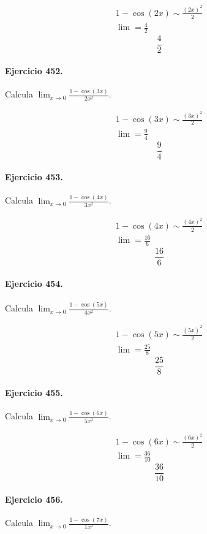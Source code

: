 \documentclass[11pt,a4paper]{article}
\begin{document}
\[
\begin{aligned}
1-\cos(2x)\sim \frac{(2x)^2}{2}\\
\lim=\frac{4}{2}
\end{aligned}
\]
\[\boxed{\frac{4}{2}}\]


\paragraph{Ejercicio 452.} Calcula $\displaystyle\lim_{x\to0}\frac{1-\cos(3x)}{2x^2}$.

\[
\begin{aligned}
1-\cos(3x)\sim \frac{(3x)^2}{2}\\
\lim=\frac{9}{4}
\end{aligned}
\]
\[\boxed{\frac{9}{4}}\]


\paragraph{Ejercicio 453.} Calcula $\displaystyle\lim_{x\to0}\frac{1-\cos(4x)}{3x^2}$.

\[
\begin{aligned}
1-\cos(4x)\sim \frac{(4x)^2}{2}\\
\lim=\frac{16}{6}
\end{aligned}
\]
\[\boxed{\frac{16}{6}}\]


\paragraph{Ejercicio 454.} Calcula $\displaystyle\lim_{x\to0}\frac{1-\cos(5x)}{4x^2}$.

\[
\begin{aligned}
1-\cos(5x)\sim \frac{(5x)^2}{2}\\
\lim=\frac{25}{8}
\end{aligned}
\]
\[\boxed{\frac{25}{8}}\]


\paragraph{Ejercicio 455.} Calcula $\displaystyle\lim_{x\to0}\frac{1-\cos(6x)}{5x^2}$.

\[
\begin{aligned}
1-\cos(6x)\sim \frac{(6x)^2}{2}\\
\lim=\frac{36}{10}
\end{aligned}
\]
\[\boxed{\frac{36}{10}}\]


\paragraph{Ejercicio 456.} Calcula $\displaystyle\lim_{x\to0}\frac{1-\cos(7x)}{1x^2}$.
\end{document}
